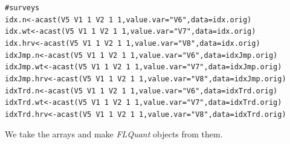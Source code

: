 \documentclass[a4paper,english,10pt]{article}\usepackage[]{graphicx}\usepackage[]{color}
\makeatletter
\newcommand{\hlnum}[1]{\textcolor[rgb]{0.2,0.2,0.2}{#1}}%
\newcommand{\hlstr}[1]{\textcolor[rgb]{0.2,0.2,0.2}{#1}}%
\newcommand{\hlcom}[1]{\textcolor[rgb]{0.2,0.267,0.4}{#1}}%
\newcommand{\hlopt}[1]{\textcolor[rgb]{0.2,0.2,0.2}{#1}}%
\newcommand{\hlstd}[1]{\textcolor[rgb]{0,0,0}{#1}}%
\newcommand{\hlkwb}[1]{\textcolor[rgb]{0.361,0.506,0.596}{#1}}%
\newcommand{\hlkwc}[1]{\textcolor[rgb]{0.361,0.506,0.596}{#1}}%
\newcommand{\hlkwd}[1]{\textcolor[rgb]{0.361,0.506,0.596}{#1}}%
\newenvironment{kframe}{%
 \def\at@end@of@kframe{}%
 \ifinner\ifhmode%
  \def\at@end@of@kframe{\end{minipage}}%
  \begin{minipage}{\columnwidth}%
 \fi\fi%
 \def\FrameCommand##1{\hskip\@totalleftmargin \hskip-\fboxsep
 \colorbox{shadecolor}{##1}\hskip-\fboxsep
     \hskip-\linewidth \hskip-\@totalleftmargin \hskip\columnwidth}%
 \MakeFramed {\advance\hsize-\width
   \@totalleftmargin\z@ \linewidth\hsize
   \@setminipage}}%
 {\par\unskip\endMakeFramed%
 \at@end@of@kframe}
\newenvironment{knitrout}{}{} %
\newcommand{\class}[1]{{\textit{#1}}}
\makeatother
\begin{document}
\begin{knitrout}
\begin{kframe}
\begin{alltt}
\hlcom{# surveys}
\hlstd{idx.n} \hlkwb{<-} \hlkwd{acast}\hlstd{(V5} \hlopt{~} \hlstd{V1} \hlopt{~} \hlnum{1} \hlopt{~} \hlstd{V2} \hlopt{~} \hlnum{1} \hlopt{~} \hlnum{1}\hlstd{,} \hlkwc{value.var} \hlstd{=} \hlstr{"V6"}\hlstd{,} \hlkwc{data} \hlstd{= idx.orig)}
\hlstd{idx.wt} \hlkwb{<-} \hlkwd{acast}\hlstd{(V5} \hlopt{~} \hlstd{V1} \hlopt{~} \hlnum{1} \hlopt{~} \hlstd{V2} \hlopt{~} \hlnum{1} \hlopt{~} \hlnum{1}\hlstd{,} \hlkwc{value.var} \hlstd{=} \hlstr{"V7"}\hlstd{,} \hlkwc{data} \hlstd{= idx.orig)}
\hlstd{idx.hrv} \hlkwb{<-} \hlkwd{acast}\hlstd{(V5} \hlopt{~} \hlstd{V1} \hlopt{~} \hlnum{1} \hlopt{~} \hlstd{V2} \hlopt{~} \hlnum{1} \hlopt{~} \hlnum{1}\hlstd{,} \hlkwc{value.var} \hlstd{=} \hlstr{"V8"}\hlstd{,} \hlkwc{data} \hlstd{= idx.orig)}
\hlstd{idxJmp.n} \hlkwb{<-} \hlkwd{acast}\hlstd{(V5} \hlopt{~} \hlstd{V1} \hlopt{~} \hlnum{1} \hlopt{~} \hlstd{V2} \hlopt{~} \hlnum{1} \hlopt{~} \hlnum{1}\hlstd{,} \hlkwc{value.var} \hlstd{=} \hlstr{"V6"}\hlstd{,} \hlkwc{data} \hlstd{= idxJmp.orig)}
\hlstd{idxJmp.wt} \hlkwb{<-} \hlkwd{acast}\hlstd{(V5} \hlopt{~} \hlstd{V1} \hlopt{~} \hlnum{1} \hlopt{~} \hlstd{V2} \hlopt{~} \hlnum{1} \hlopt{~} \hlnum{1}\hlstd{,} \hlkwc{value.var} \hlstd{=} \hlstr{"V7"}\hlstd{,} \hlkwc{data} \hlstd{= idxJmp.orig)}
\hlstd{idxJmp.hrv} \hlkwb{<-} \hlkwd{acast}\hlstd{(V5} \hlopt{~} \hlstd{V1} \hlopt{~} \hlnum{1} \hlopt{~} \hlstd{V2} \hlopt{~} \hlnum{1} \hlopt{~} \hlnum{1}\hlstd{,} \hlkwc{value.var} \hlstd{=} \hlstr{"V8"}\hlstd{,} \hlkwc{data} \hlstd{= idxJmp.orig)}
\hlstd{idxTrd.n} \hlkwb{<-} \hlkwd{acast}\hlstd{(V5} \hlopt{~} \hlstd{V1} \hlopt{~} \hlnum{1} \hlopt{~} \hlstd{V2} \hlopt{~} \hlnum{1} \hlopt{~} \hlnum{1}\hlstd{,} \hlkwc{value.var} \hlstd{=} \hlstr{"V6"}\hlstd{,} \hlkwc{data} \hlstd{= idxTrd.orig)}
\hlstd{idxTrd.wt} \hlkwb{<-} \hlkwd{acast}\hlstd{(V5} \hlopt{~} \hlstd{V1} \hlopt{~} \hlnum{1} \hlopt{~} \hlstd{V2} \hlopt{~} \hlnum{1} \hlopt{~} \hlnum{1}\hlstd{,} \hlkwc{value.var} \hlstd{=} \hlstr{"V7"}\hlstd{,} \hlkwc{data} \hlstd{= idxTrd.orig)}
\hlstd{idxTrd.hrv} \hlkwb{<-} \hlkwd{acast}\hlstd{(V5} \hlopt{~} \hlstd{V1} \hlopt{~} \hlnum{1} \hlopt{~} \hlstd{V2} \hlopt{~} \hlnum{1} \hlopt{~} \hlnum{1}\hlstd{,} \hlkwc{value.var} \hlstd{=} \hlstr{"V8"}\hlstd{,} \hlkwc{data} \hlstd{= idxTrd.orig)}
\end{alltt}
\end{kframe}
\end{knitrout}


We take the arrays and make \class{FLQuant} objects from them.
\end{document}
